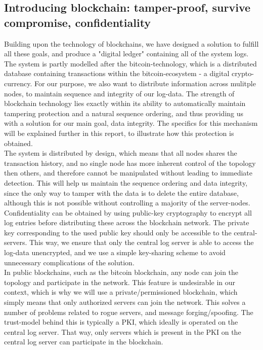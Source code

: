 \subsection{Introducing blockchain: tamper-proof, survive compromise, confidentiality}
Building upon the technology of blockchains, we have designed a solution to fulfill all these goals, and produce a "digital ledger" containing all of the system logs. The system is partly modelled after the bitcoin-technology, which is a distributed database containing transactions within the bitcoin-ecosystem - a digital crypto-currency. For our purpose, we also want to distribute information across mulitple nodes, to maintain sequence and integrity of our log-data. The strength of blockchain technology lies exactly within its ability to automatically maintain tampering protection and a natural sequence ordering, and thus providing us with a solution for our main goal, data integrity. The specifics for this mechanism will be explained further in this report, to illustrate how this protection is obtained.
\\The system is distributed by design, which means that all nodes shares the transaction history, and no single node has more inherent control of the topology then others, and therefore cannot be manipulated without leading to immediate detection. This will help us maintain the sequence ordering and data integrity, since the only way to tamper with the data is to delete the entire database, although this is not possible without controlling a majority of the server-nodes.
\\Confidentiality can be obtained by using public-key cryptography to encrypt all log entries before distributing these across the blockchain network. The private key corresponding to the used public key should only be accessible to the central-servers. This way, we ensure that only the central log server is able to access the log-data unencrypted, and we use a simple key-sharing scheme to avoid unnecessary complications of the solution.
\\In public blockchains, such as the bitcoin blockchain, any node can join the topology and participate in the network. This feature is undesirable in our context, which is why we will use a private/permissioned blockchain, which simply means that only authorized servers can join the network. This solves a number of problems related to rogue servers, and message forging/spoofing. The trust-model behind this is typically a PKI, which ideally is operated on the central log server. That way, only servers which is present in the PKI on the central log server can participate in the blockchain.

